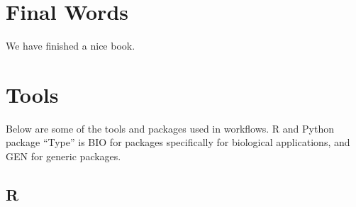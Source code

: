 \documentclass[
]{book}
\begin{document}
\hypertarget{final-words}{%
\chapter{Final Words}\label{final-words}}

We have finished a nice book.

\hypertarget{tools}{%
\chapter{Tools}\label{tools}}

Below are some of the tools and packages used in workflows. R and Python package ``Type'' is BIO for packages specifically for biological applications, and GEN for generic packages.

\hypertarget{r}{%
\section{R}\label{r}}
\end{document}
